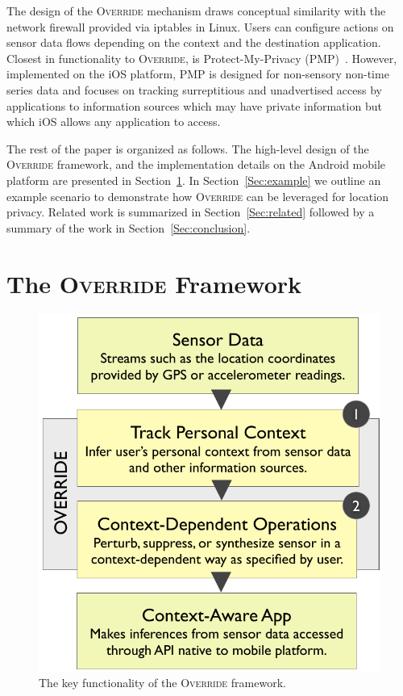 \documentclass[10pt]{sensys-proc}
\begin{document}
The design of the \textsc{Override} mechanism draws conceptual similarity with the network firewall provided via iptables in Linux. Users can configure actions on sensor data flows depending on the context and the destination application. Closest in functionality to \textsc{Override}, is Protect-My-Privacy (PMP)~\cite{pmp}. However, implemented on the iOS platform, PMP is designed for non-sensory non-time series data and focuses on tracking surreptitious and unadvertised access by applications to information sources which may have private information but which iOS allows any application to access.

The rest of the paper is organized as follows. The high-level design of the \textsc{Override} framework, and the implementation details on the Android mobile platform are presented in Section~\ref{Sec:architecture}. In Section~\ref{Sec:example} we outline an example scenario to demonstrate how \textsc{Override} can be leveraged for location privacy. Related work is summarized in Section~\ref{Sec:related} followed by a summary of the work in Section~\ref{Sec:conclusion}.

\section{The \textsc{Override} Framework}
\label{Sec:architecture}
\begin{figure}
\includegraphics[width=\columnwidth]{../figures/flow5.pdf}
\caption{The key functionality of the \textsc{Override} framework.}
\label{fig:flow}
\end{figure}
\end{document}
